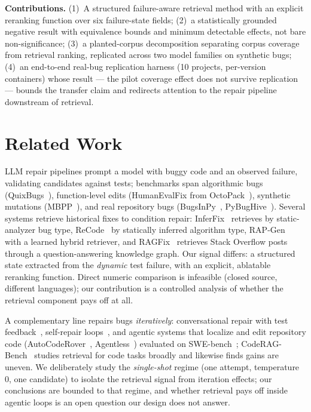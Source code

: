 \documentclass[10pt,conference,a4paper]{IEEEtran}
\begin{document}
\textbf{Contributions.} (1)~A structured failure-aware retrieval method
with an explicit reranking function over six failure-state fields; (2)~a
statistically grounded negative result with equivalence bounds and minimum
detectable effects, not bare non-significance; (3)~a planted-corpus
decomposition separating corpus coverage from retrieval ranking, replicated
across two model families on synthetic bugs; (4)~an end-to-end real-bug
replication harness (10 projects, per-version containers) whose result ---
the pilot coverage effect does not survive replication --- bounds the
transfer claim and redirects attention to the repair pipeline downstream of
retrieval.

\section{Related Work}
\label{sec:related}

LLM repair pipelines prompt a model with buggy code and an observed failure,
validating candidates against tests; benchmarks span algorithmic bugs
(QuixBugs~\cite{quixbugs}), function-level edits (HumanEvalFix from
OctoPack~\cite{octopack}), synthetic mutations (MBPP~\cite{mbpp}), and real
repository bugs (BugsInPy~\cite{bugsinpy}, PyBugHive~\cite{pybughive}).
Several systems retrieve historical fixes to condition repair:
InferFix~\cite{inferfix} retrieves by static-analyzer bug type,
ReCode~\cite{recode} by statically inferred algorithm type,
RAP-Gen~\cite{rapgen} with a learned hybrid retriever, and
RAGFix~\cite{ragfix} retrieves Stack Overflow posts through a
question-answering knowledge graph. Our signal differs: a structured state
extracted from the \emph{dynamic} test failure, with an explicit, ablatable
reranking function. Direct numeric comparison is infeasible (closed source,
different languages); our contribution is a controlled analysis of whether
the retrieval component pays off at all.

A complementary line repairs bugs \emph{iteratively}: conversational repair
with test feedback~\cite{chatrepair}, self-repair loops~\cite{selfrepair},
and agentic systems that localize and edit repository code
(AutoCodeRover~\cite{autocoderover}, Agentless~\cite{agentless}) evaluated
on SWE-bench~\cite{swebench}; CodeRAG-Bench~\cite{coderagbench} studies
retrieval for code tasks broadly and likewise finds gains are uneven. We
deliberately study the \emph{single-shot} regime (one attempt, temperature
0, one candidate) to isolate the retrieval signal from iteration effects;
our conclusions are bounded to that regime, and whether retrieval pays off
inside agentic loops is an open question our design does not answer.
\end{document}
